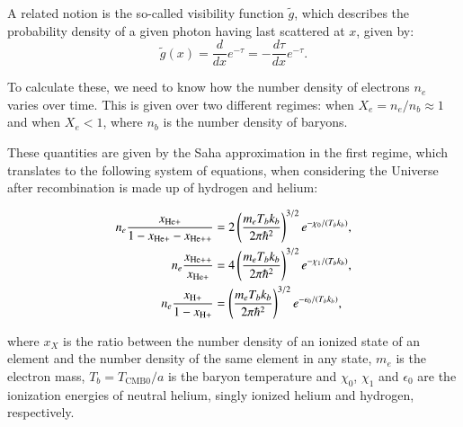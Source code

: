 \documentclass{aa}
\begin{document}
A related notion is the so-called visibility function $\tilde g$, which describes the probability density of a given photon having last scattered at $x$, given by:
\begin{equation}
\tilde{g}(x) = \frac{d}{dx}e^{-\tau} = -\frac{d\tau}{dx}e^{-\tau}.
\end{equation}

To calculate these, we need to know how the number density of electrons $n_e$ varies over time. This is given over two different regimes: when $X_e = n_e/n_b \approx 1$ and when $X_e < 1$, where $n_b$ is the number density of baryons.

These quantities are given by the Saha approximation in the first regime, which translates to the following system of equations, when considering the Universe after recombination is made up of hydrogen and helium:

\begin{align}
n_e\frac{x_{\rm He+}}{1-x_{\rm He+}-x_{\rm He++}} &= 2\left(\frac{m_eT_b k_b}{2\pi\hbar^2}\right)^{3/2}e^{-\chi_0/(T_bk_b)},\\
n_e\frac{x_{\rm He++}}{x_{\rm He+}} &= 4\left(\frac{m_eT_bk_b}{2\pi\hbar^2}\right)^{3/2}e^{-\chi_1/(T_bk_b)},\\
n_e\frac{x_{\rm H+}}{1-x_{\rm H+}} &= \left(\frac{m_eT_bk_b}{2\pi\hbar^2}\right)^{3/2}e^{-\epsilon_0/(T_bk_b)}, \label{eq:saha_h}
\end{align}

where $x_X$ is the ratio between the number density of an ionized state of an element and the number density of the same element in any state, $m_e$ is the electron mass, $T_b = T_\text{CMB0}/a$ is the baryon temperature and $\chi_0$, $\chi_1$ and $\epsilon_0$ are the ionization energies of neutral helium, singly ionized helium and hydrogen, respectively.
\end{document}
